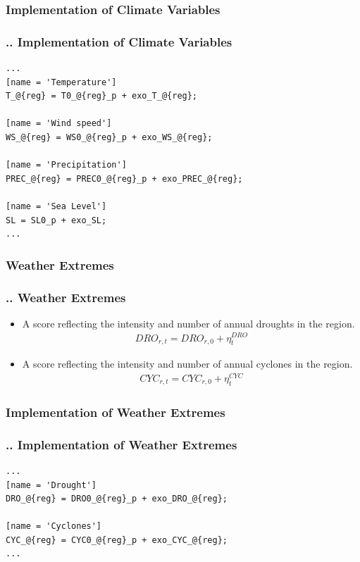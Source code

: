 \documentclass[11pt,aspectratio=169]{beamer}
\begin{document}
\subsubsection{Implementation of Climate Variables}
\begin{frame}[fragile]
\frametitle{{\thesection.\thesubsection.\thesubsubsection} Implementation of Climate Variables}

\begin{lstlisting}[frame = single]
...
[name = 'Temperature']
T_@{reg} = T0_@{reg}_p + exo_T_@{reg};

[name = 'Wind speed']
WS_@{reg} = WS0_@{reg}_p + exo_WS_@{reg};

[name = 'Precipitation']
PREC_@{reg} = PREC0_@{reg}_p + exo_PREC_@{reg};

[name = 'Sea Level']
SL = SL0_p + exo_SL;
...
\end{lstlisting}
\end{frame}

\subsubsection{Weather Extremes}
\begin{frame}
\frametitle{{\thesection.\thesubsection.\thesubsubsection} Weather Extremes}
\scriptsize
\begin{itemize}
\item A score reflecting the intensity and number of annual droughts in the region.
\begin{align*}
DRO_{r,t} = DRO_{r,0} + \eta^{DRO}_{t}
\end{align*}
\item A score reflecting the intensity and number of annual cyclones in the region.
\begin{align*}
CYC_{r,t} = CYC_{r,0} + \eta^{CYC}_{t}
\end{align*}
\end{itemize}
\end{frame}

\subsubsection{Implementation of Weather Extremes}
\begin{frame}[fragile]
\frametitle{{\thesection.\thesubsection.\thesubsubsection} Implementation of Weather Extremes}

\begin{lstlisting}[frame = single]
...
[name = 'Drought']
DRO_@{reg} = DRO0_@{reg}_p + exo_DRO_@{reg};

[name = 'Cyclones']
CYC_@{reg} = CYC0_@{reg}_p + exo_CYC_@{reg};
...
\end{lstlisting}
\end{frame}
\end{document}
